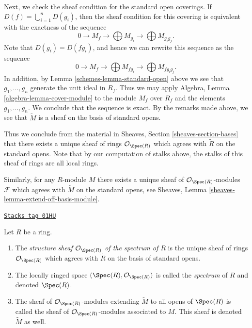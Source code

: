 \medskip\noindent
Next, we check the sheaf condition for the standard open coverings.
If $D(f) = \bigcup_{i = 1}^n D(g_i)$, then the sheaf condition
for this covering is equivalent with the exactness of the
sequence
$$
0 \to M_f \to \bigoplus M_{g_i} \to \bigoplus M_{g_ig_j}.
$$
Note that $D(g_i) = D(fg_i)$, and hence we can rewrite this
sequence as the sequence
$$
0 \to M_f \to \bigoplus M_{fg_i} \to \bigoplus M_{fg_ig_j}.
$$
In addition, by Lemma \ref{schemes-lemma-standard-open} above
we see that $g_1, \ldots, g_n$ generate the unit ideal
in $R_f$. Thus we may apply
Algebra, Lemma \ref{algebra-lemma-cover-module}
to the module $M_f$ over $R_f$ and the elements $g_1, \ldots, g_n$.
We conclude that the sequence is exact. By the remarks
made above, we see that $\widetilde M$ is a sheaf
on the basis of standard opens.

\medskip\noindent
Thus we conclude from the material in
Sheaves, Section \ref{sheaves-section-bases}
that there exists a
unique sheaf of rings $\mathcal{O}_{\Spec(R)}$
which agrees with $\widetilde R$ on the standard opens.
Note that by our computation of stalks above, the
stalks of this sheaf of rings are all local rings.

\medskip\noindent
Similarly, for any $R$-module $M$ there exists
a unique sheaf of $\mathcal{O}_{\Spec(R)}$-modules
$\mathcal{F}$ which agrees with $\widetilde M$ on the
standard opens, see
Sheaves, Lemma \ref{sheaves-lemma-extend-off-basis-module}.

\begin{definition}
\label{schemes-definition-structure-sheaf}
\href{https://stacks.math.columbia.edu/tag/01HU}{\texttt{Stacks tag 01HU}}

Let $R$ be a ring.
\begin{enumerate}
\item The {\it structure sheaf $\mathcal{O}_{\Spec(R)}$ of the
spectrum of $R$} is the unique sheaf of rings $\mathcal{O}_{\Spec(R)}$
which agrees with $\widetilde R$ on the basis of standard opens.
\item The locally ringed space
$(\Spec(R), \mathcal{O}_{\Spec(R)})$ is called
the {\it spectrum} of $R$ and denoted $\Spec(R)$.
\item The sheaf of $\mathcal{O}_{\Spec(R)}$-modules
extending $\widetilde M$ to all opens of $\Spec(R)$
is called the sheaf of $\mathcal{O}_{\Spec(R)}$-modules
associated to $M$. This sheaf is denoted $\widetilde M$ as
well.
\end{enumerate}
\end{definition}

